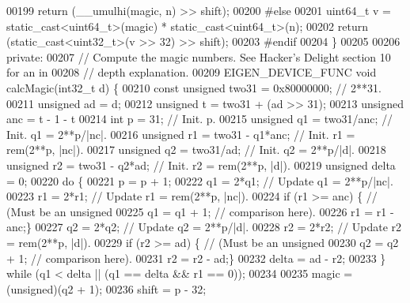\begin{DoxyCode}
00199     \textcolor{keywordflow}{return} (\_\_umulhi(magic, n) >> shift);
00200 \textcolor{preprocessor}{#else}
00201     uint64\_t v = \textcolor{keyword}{static\_cast<}uint64\_t\textcolor{keyword}{>}(magic) * static\_cast<uint64\_t>(n);
00202     \textcolor{keywordflow}{return} (static\_cast<uint32\_t>(v >> 32) >> shift);
00203 \textcolor{preprocessor}{#endif}
00204   \}
00205 
00206 \textcolor{keyword}{private}:
00207   \textcolor{comment}{// Compute the magic numbers. See Hacker's Delight section 10 for an in}
00208   \textcolor{comment}{// depth explanation.}
00209   EIGEN\_DEVICE\_FUNC \textcolor{keywordtype}{void} calcMagic(int32\_t d) \{
00210    \textcolor{keyword}{const} \textcolor{keywordtype}{unsigned} two31 = 0x80000000;     \textcolor{comment}{// 2**31.}
00211    \textcolor{keywordtype}{unsigned} ad = d;
00212    \textcolor{keywordtype}{unsigned} t = two31 + (ad >> 31);
00213    \textcolor{keywordtype}{unsigned} anc = t - 1 - t%
00214    \textcolor{keywordtype}{int} p = 31;                      \textcolor{comment}{// Init. p.}
00215    \textcolor{keywordtype}{unsigned} q1 = two31/anc;         \textcolor{comment}{// Init. q1 = 2**p/|nc|.}
00216    \textcolor{keywordtype}{unsigned} r1 = two31 - q1*anc;    \textcolor{comment}{// Init. r1 = rem(2**p, |nc|).}
00217    \textcolor{keywordtype}{unsigned} q2 = two31/ad;          \textcolor{comment}{// Init. q2 = 2**p/|d|.}
00218    \textcolor{keywordtype}{unsigned} r2 = two31 - q2*ad;     \textcolor{comment}{// Init. r2 = rem(2**p, |d|).}
00219    \textcolor{keywordtype}{unsigned} delta = 0;
00220    \textcolor{keywordflow}{do} \{
00221       p = p + 1;
00222       q1 = 2*q1;           \textcolor{comment}{// Update q1 = 2**p/|nc|.}
00223       r1 = 2*r1;           \textcolor{comment}{// Update r1 = rem(2**p, |nc|).}
00224       \textcolor{keywordflow}{if} (r1 >= anc) \{     \textcolor{comment}{// (Must be an unsigned}
00225          q1 = q1 + 1;      \textcolor{comment}{// comparison here).}
00226          r1 = r1 - anc;\}
00227       q2 = 2*q2;           \textcolor{comment}{// Update q2 = 2**p/|d|.}
00228       r2 = 2*r2;           \textcolor{comment}{// Update r2 = rem(2**p, |d|).}
00229       \textcolor{keywordflow}{if} (r2 >= ad) \{      \textcolor{comment}{// (Must be an unsigned}
00230          q2 = q2 + 1;      \textcolor{comment}{// comparison here).}
00231          r2 = r2 - ad;\}
00232       delta = ad - r2;
00233    \} \textcolor{keywordflow}{while} (q1 < delta || (q1 == delta && r1 == 0));
00234 
00235    magic = (unsigned)(q2 + 1);
00236    shift = p - 32;

\end{DoxyCode}
